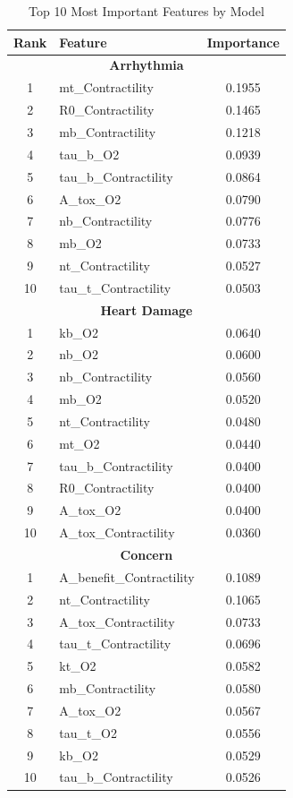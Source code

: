 \documentclass[11pt,a4paper]{article}
\begin{document}
\begin{table}[htbp]
\centering
\caption{Top 10 Most Important Features by Model}
\label{tab:features}
\begin{tabular}{clc}
\toprule
\textbf{Rank} & \textbf{Feature} & \textbf{Importance} \\
\midrule
\multicolumn{3}{c}{\textbf{Arrhythmia}} \\
\midrule
1 & mt\_Contractility & 0.1955 \\
2 & R0\_Contractility & 0.1465 \\
3 & mb\_Contractility & 0.1218 \\
4 & tau\_b\_O2 & 0.0939 \\
5 & tau\_b\_Contractility & 0.0864 \\
6 & A\_tox\_O2 & 0.0790 \\
7 & nb\_Contractility & 0.0776 \\
8 & mb\_O2 & 0.0733 \\
9 & nt\_Contractility & 0.0527 \\
10 & tau\_t\_Contractility & 0.0503 \\
\midrule
\multicolumn{3}{c}{\textbf{Heart Damage}} \\
\midrule
1 & kb\_O2 & 0.0640 \\
2 & nb\_O2 & 0.0600 \\
3 & nb\_Contractility & 0.0560 \\
4 & mb\_O2 & 0.0520 \\
5 & nt\_Contractility & 0.0480 \\
6 & mt\_O2 & 0.0440 \\
7 & tau\_b\_Contractility & 0.0400 \\
8 & R0\_Contractility & 0.0400 \\
9 & A\_tox\_O2 & 0.0400 \\
10 & A\_tox\_Contractility & 0.0360 \\
\midrule
\multicolumn{3}{c}{\textbf{Concern}} \\
\midrule
1 & A\_benefit\_Contractility & 0.1089 \\
2 & nt\_Contractility & 0.1065 \\
3 & A\_tox\_Contractility & 0.0733 \\
4 & tau\_t\_Contractility & 0.0696 \\
5 & kt\_O2 & 0.0582 \\
6 & mb\_Contractility & 0.0580 \\
7 & A\_tox\_O2 & 0.0567 \\
8 & tau\_t\_O2 & 0.0556 \\
9 & kb\_O2 & 0.0529 \\
10 & tau\_b\_Contractility & 0.0526 \\
\midrule

\bottomrule
\end{tabular}
\end{table}
\end{document}
